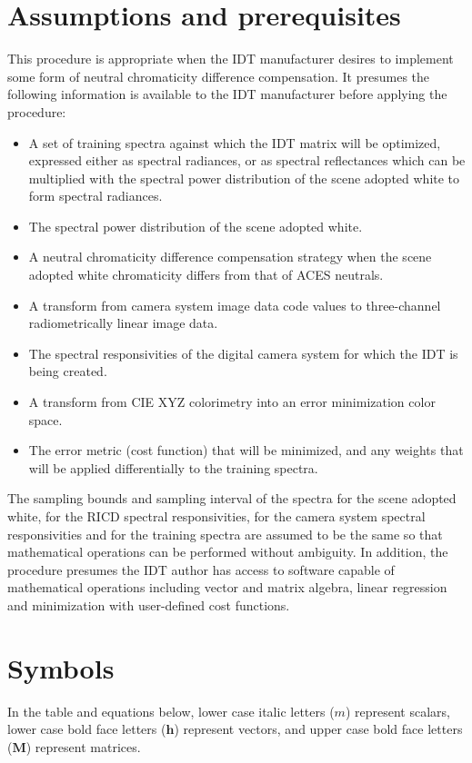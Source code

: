 \section{Assumptions and prerequisites}
This procedure is appropriate when the IDT manufacturer desires to implement some form of neutral chromaticity difference compensation. It presumes the following information is available to the IDT manufacturer before applying the procedure:

\begin{itemize}
	\item	A set of training spectra against which the IDT matrix will be optimized, expressed either as spectral radiances, or as spectral reflectances which can be multiplied with the spectral power distribution of the scene adopted white to form spectral radiances.
	\item	The spectral power distribution of the scene adopted white.
	\item	A neutral chromaticity difference compensation strategy when the scene adopted white chromaticity differs from that of ACES neutrals.
	\item	A transform from camera system image data code values to three-channel radiometrically linear image data.
	\item	The spectral responsivities of the digital camera system for which the IDT is being created.
	\item	A transform from CIE XYZ colorimetry into an error minimization color space.
	\item	The error metric (cost function) that will be minimized, and any weights that will be applied differentially to the training spectra.
\end{itemize}

The sampling bounds and sampling interval of the spectra for the scene adopted white, for the RICD spectral responsivities, for the camera system spectral responsivities and for the training spectra are assumed to be the same so that mathematical operations can be performed without ambiguity. In addition, the procedure presumes the IDT author has access to software capable of mathematical operations including vector and matrix algebra, linear regression and minimization with user-defined cost functions.

\section{Symbols}
\label{sec:symbols}
In the table and equations below, lower case italic letters ($m$) represent scalars, lower case bold face letters ($\mathbf{h}$) represent vectors, and upper case bold face letters ($\mathbf{M}$) represent matrices.

